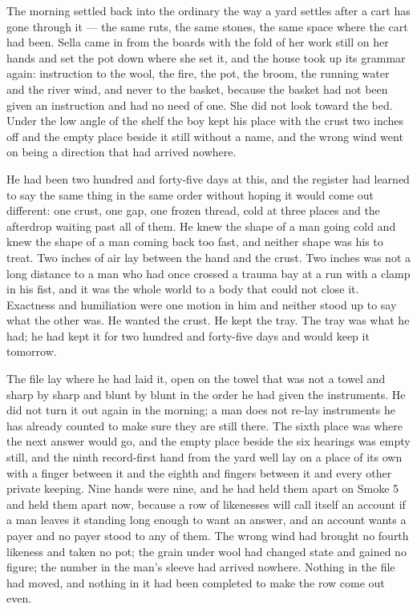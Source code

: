 \scenebreak

The morning settled back into the ordinary the way a yard settles after a cart has gone through it --- the same ruts, the same stones, the same space where the cart had been. Sella came in from the boards with the fold of her work still on her hands and set the pot down where she set it, and the house took up its grammar again: instruction to the wool, the fire, the pot, the broom, the running water and the river wind, and never to the basket, because the basket had not been given an instruction and had no need of one. She did not look toward the bed. Under the low angle of the shelf the boy kept his place with the crust two inches off and the empty place beside it still without a name, and the wrong wind went on being a direction that had arrived nowhere.

He had been two hundred and forty-five days at this, and the register had learned to say the same thing in the same order without hoping it would come out different: one crust, one gap, one frozen thread, cold at three places and the afterdrop waiting past all of them. He knew the shape of a man going cold and knew the shape of a man coming back too fast, and neither shape was his to treat. Two inches of air lay between the hand and the crust. Two inches was not a long distance to a man who had once crossed a trauma bay at a run with a clamp in his fist, and it was the whole world to a body that could not close it. Exactness and humiliation were one motion in him and neither stood up to say what the other was. He wanted the crust. He kept the tray. The tray was what he had; he had kept it for two hundred and forty-five days and would keep it tomorrow.

The file lay where he had laid it, open on the towel that was not a towel and sharp by sharp and blunt by blunt in the order he had given the instruments. He did not turn it out again in the morning; a man does not re-lay instruments he has already counted to make sure they are still there. The sixth place was where the next answer would go, and the empty place beside the six hearings was empty still, and the ninth record-first hand from the yard well lay on a place of its own with a finger between it and the eighth and fingers between it and every other private keeping. Nine hands were nine, and he had held them apart on Smoke 5 and held them apart now, because a row of likenesses will call itself an account if a man leaves it standing long enough to want an answer, and an account wants a payer and no payer stood to any of them. The wrong wind had brought no fourth likeness and taken no pot; the grain under wool had changed state and gained no figure; the number in the man's sleeve had arrived nowhere. Nothing in the file had moved, and nothing in it had been completed to make the row come out even.

